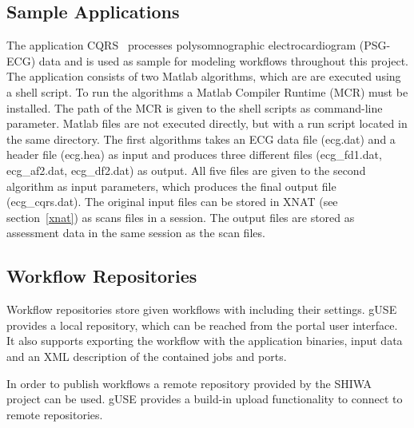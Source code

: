 \subsection{Sample Applications}\label{applications}

The application CQRS~\cite{krefting10} processes polysomnographic electrocardiogram (PSG-ECG) data and is used as sample for modeling workflows throughout this project.
The application consists of two Matlab algorithms, which are are executed using a shell script.
To run the algorithms a Matlab Compiler Runtime (MCR) must be installed.
The path of the MCR is given to the shell scripts as command-line parameter.
Matlab files are not executed directly, but with a run script located in the same directory.
The first algorithms takes an ECG data file (ecg.dat) and a header file (ecg.hea) as input and produces three different files (ecg\_fd1.dat, ecg\_af2.dat, ecg\_df2.dat) as output.
All five files are given to the second algorithm as input parameters, which produces the final output file (ecg\_cqrs.dat).
The original input files can be stored in XNAT (see section~\ref{xnat}) as scans files in a session.
The output files are stored as assessment data in the same session as the scan files.

\subsection{Workflow Repositories}\label{repositories}

Workflow repositories store given workflows with including their settings.
gUSE provides a local repository, which can be reached from the portal user interface.
It also supports exporting the workflow with the application binaries, input data and an XML description of the contained jobs and ports.

In order to publish workflows a remote repository \cite{somnocqrs} provided by the SHIWA project can be used.
gUSE provides a build-in upload functionality to connect to remote repositories.